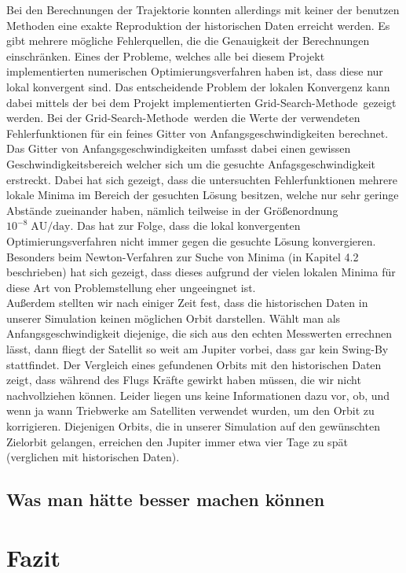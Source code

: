 Bei den Berechnungen der Trajektorie konnten allerdings mit keiner der benutzen Methoden eine exakte Reproduktion der historischen Daten erreicht werden. Es gibt mehrere mögliche Fehlerquellen, die die Genauigkeit der Berechnungen einschränken. Eines der Probleme, welches alle bei diesem Projekt implementierten numerischen Optimierungsverfahren haben ist, dass diese nur lokal konvergent sind. Das entscheidende  Problem der lokalen Konvergenz kann dabei mittels der bei dem Projekt implementierten \glqq Grid-Search-Methode\grqq\, gezeigt werden. Bei der \glqq Grid-Search-Methode\grqq\, werden die Werte der verwendeten Fehlerfunktionen für ein feines Gitter von Anfangsgeschwindigkeiten berechnet. Das Gitter von Anfangsgeschwindigkeiten umfasst dabei einen gewissen Geschwindigkeitsbereich welcher sich um die gesuchte Anfagsgeschwindigkeit erstreckt. Dabei hat sich gezeigt, dass die untersuchten Fehlerfunktionen mehrere lokale Minima im Bereich der gesuchten Lösung besitzen, welche nur sehr geringe Abstände zueinander haben, nämlich teilweise in der Größenordnung $10^{-8}\;\text{AU/day}$. Das hat zur Folge, dass die lokal konvergenten Optimierungsverfahren nicht immer gegen die gesuchte Lösung konvergieren. Besonders beim Newton-Verfahren zur Suche von Minima (in Kapitel 4.2 beschrieben) hat sich gezeigt, dass dieses aufgrund der vielen lokalen Minima für diese Art von Problemstellung eher ungeeingnet ist.\\
Außerdem stellten wir nach einiger Zeit fest, dass die historischen Daten in unserer Simulation keinen möglichen Orbit darstellen. Wählt man als Anfangsgeschwindigkeit diejenige, die sich aus den echten Messwerten errechnen lässt, dann fliegt der Satellit so weit am Jupiter vorbei, dass gar kein Swing-By stattfindet. Der Vergleich eines gefundenen Orbits mit den historischen Daten zeigt, dass während des Flugs Kräfte gewirkt haben müssen, die wir nicht nachvollziehen können. Leider liegen uns keine Informationen dazu vor, ob, und wenn ja wann Triebwerke am Satelliten verwendet wurden, um den Orbit zu korrigieren. Diejenigen Orbits, die in unserer Simulation auf den gewünschten Zielorbit gelangen, erreichen den Jupiter immer etwa vier Tage zu spät (verglichen mit historischen Daten).

\subsection{Was man hätte besser machen können}

\section{Fazit}




